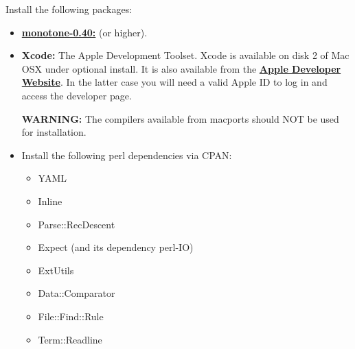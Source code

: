 \documentclass[12pt]{article}
\begin{document}
Install the following packages:
\begin{itemize}
   \item[]\href{http://monotone.ca/}{\bf monotone-0.40:} (or higher).
   \item[]{\bf Xcode:} The Apple Development Toolset. Xcode is available on disk 2 of Mac OSX under optional install. It is also available from the \href{http://developer.apple.com/technology/xcode.html}{\bf Apple Developer Website}. In the latter case  you will need a valid Apple ID to log in and access the developer page.
   
   {\bf WARNING:} The compilers available from macports should NOT be used for installation.
   \item[]Install the following perl dependencies via CPAN:
      \begin{itemize}
         \item YAML
         \item Inline
         \item Parse::RecDescent
         \item Expect (and its dependency perl-IO)
         \item ExtUtils
         \item Data::Comparator
         \item File::Find::Rule
         \item Term::Readline
      \end{itemize}
   \end{itemize}
   
\end{document}
